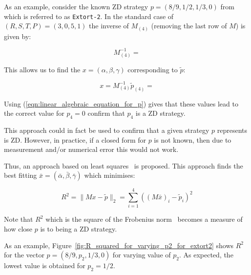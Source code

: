 \documentclass[a4paper]{article}
\begin{document}
As an example, consider the known ZD strategy \(p=(8 / 9, 1 / 2, 1 / 3, 0)\)
from~\cite{Stewart2012} which is referred to as \texttt{Extort-2}. In the
standard case of \((R, S, T, P)=(3, 0, 5, 1)\) the inverse
of \(M_{(4)}\) (removing the last row of \(M\)) is given by:

\begin{equation}\label{eqn:inverse_of_M4}
    M_{(4)}^{-1} =
    
\end{equation}

This allows us to find the \(x=(\alpha, \beta, \gamma)\) corresponding to
\(\tilde p\):

\begin{equation}\label{eqn:alpha_beta_gamma_for_extort_2}
    x = M_{(4)}^{-1}\tilde p_{(4)} =
    
\end{equation}

Using (\ref{eqn:linear_algebraic_equation_for_p}) gives that these values lead
to the correct value for \(p_4=0\) confirm that \(p_4\) is a ZD strategy.

This approach could in fact be used to confirm that a given strategy \(p\)
represents is ZD. However, in practice, if a closed form for \(p\) is not
known, then due to measurement and/or numerical error this would not work.

Thus, an approach based on least squares~\cite{Golub2013} is proposed. This
approach finds the best fitting \(\bar x=(\bar\alpha, \bar\beta,
\bar\gamma)\) which minimises:

\begin{equation}\label{eqn:r_squared}
R^2 = \|M x-\tilde p\|_2 = \sum_{i=1}^{4}\left((M\bar x)_i-\tilde p_i\right)^2
\end{equation}

Note that \(R^2\) which is the square of the Frobenius norm~\cite{Golub2013}
becomes a measure of how close \(p\) is to being a ZD strategy.

As an example, Figure~\ref{fig:R_squared_for_varying_p2_for_extort2} shows
\(R^2\) for the vector \(p=(8/9, p_2, 1/3, 0)\) for varying value of \(p_2\). As
expected, the lowest value is obtained for \(p_2=1/2\).
\end{document}
